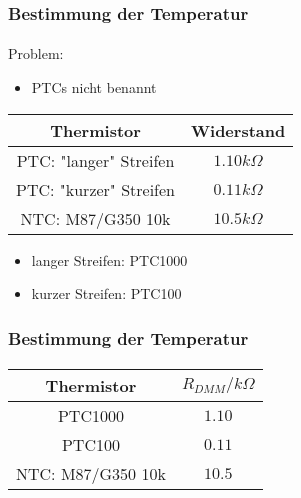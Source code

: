 \begin{frame}
    \frametitle{Bestimmung der Temperatur}
    \framesubtitle{}
    \begin{alertblock}{Problem:}
         \begin{itemize}
             \item PTCs nicht benannt
         \end{itemize}
    \end{alertblock}
    \pause
    \begin{center}
        \begin{tabular}{c|c}
            Thermistor & Widerstand \\
            \hline
            PTC: "langer" Streifen & $1.10k\Omega$\\
            PTC: "kurzer" Streifen & $0.11k\Omega$\\
            NTC: M87/G350 10k & $10.5k\Omega$
        \end{tabular}
    \end{center}
    \pause
    \begin{block}{}
        \begin{itemize}
            \item langer Streifen: PTC1000
            \item kurzer Streifen: PTC100
        \end{itemize}
    \end{block}
\end{frame}
\begin{frame}
    \frametitle{Bestimmung der Temperatur}
    \framesubtitle{}
    \begin{center}
        \begin{tabular}{c|c}
            Thermistor & $R_{DMM}/k\Omega$ \\
            \hline
            PTC1000 & $1.10$\\
            PTC100 & $0.11$\\
            NTC: M87/G350 10k & $10.5$
        \end{tabular}
    \end{center}
\end{frame}
